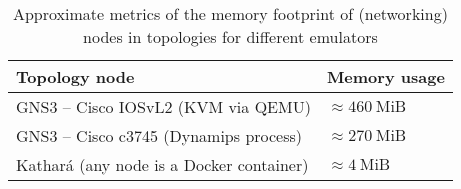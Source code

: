 \begin{table}
  \centering
  \small
  \begin{tabulary}{0.9\textwidth}{ll}
    \toprule
      \textbf{Topology node}                   & \textbf{Memory usage}\\
    \midrule
      GNS3 -- Cisco IOSvL2 (KVM via QEMU)      & $\approx 460~\mbox{MiB}$\\
      GNS3 -- Cisco c3745 (Dynamips process)   & $\approx 270~\mbox{MiB}$\\
      Kathará (any node is a Docker container) & $\approx 4~\mbox{MiB}$\\
    \bottomrule
  \end{tabulary}
  \caption{%
    Approximate metrics of the memory footprint of (networking) nodes in topologies for different emulators
  }
  \label{tab:comparativeramusage}
\end{table}
